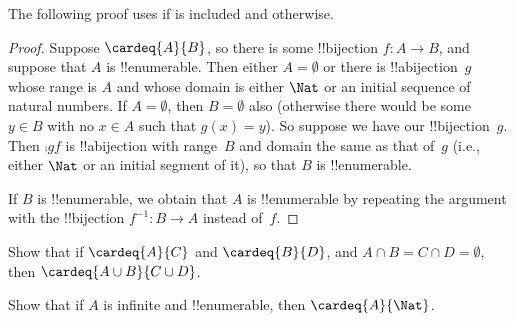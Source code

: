 \documentclass[../../../include/open-logic-section]{subfiles}
\begin{document}
\begin{editorial}
The following proof uses  if
 is included and 
otherwise.
\end{editorial}

\begin{proof}
Suppose $\cardeq{A}{B}$, so there is some !!{bijection} $f \colon A
\to B$, and suppose that $A$ is !!{enumerable}.
{
  Then either $A  = \emptyset$ or there is !!a{bijection}~$g$ whose
  range is $A$ and whose domain is either $\Nat$ or an initial
  sequence of natural numbers. If $A = \emptyset$, then $B =
  \emptyset$ also (otherwise there would be some~$y \in B$ with no $x
  \in A$ such that $g(x) = y$). So suppose we have our
  !!{bijection}~$g$. Then $\comp{g}{f}$ is !!a{bijection} with
  range~$B$ and domain the same as that of~$g$ (i.e., either $\Nat$ or
  an initial segment of it), so that $B$ is !!{enumerable}.}

If $B$ is !!{enumerable}, we obtain that $A$ is !!{enumerable} by
repeating the argument with the !!{bijection} $f^{-1}\colon B \to A$
instead of~$f$. 
\end{proof}

\begin{prob}
Show that if $\cardeq{A}{C}$ and $\cardeq{B}{D}$, and $A \cap B =
C \cap D = \emptyset$, then $\cardeq{A \cup B}{C \cup D}$.
\end{prob}

\begin{prob}
Show that if $A$ is infinite and !!{enumerable}, then
$\cardeq{A}{\Nat}$.
\end{prob}
\end{document}
